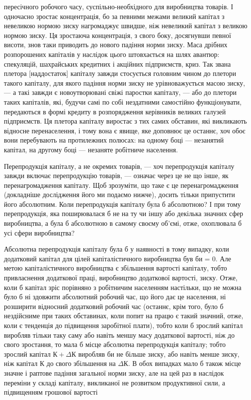 \parcont{}  %
пересічного робочого часу, суспільно-необхідного для виробництва
товарів. І одночасно зростає концентрація, бо за певними
межами великий капітал з невеликою нормою зиску нагромаджує
швидше, ніж невеликий капітал з великою нормою зиску. Ця
зростаюча концентрація, з свого боку, досягнувши певної висоти,
знов таки приводить до нового падіння норми зиску. Маса дрібних
розпорошених капіталів у наслідок цього штовхається на шлях
авантюр: спекуляцій, шахрайських кредитних і акційних підприємств,
криз. Так звана плетора [наддостаток] капіталу завжди
стосується головним чином до плетори такого капіталу, для якого
падіння норми зиску не урівноважується масою зиску, — а такі
завжди є новоутворювані свіжі паростки капіталу, — або до плетори
таких капіталів, які, будучи самі по собі нездатними самостійно
функціонувати, передаються в формі кредиту в розпорядження
керівників великих галузей підприємств. Ця плетора капіталу виростає
з тих самих обставин, які викликають відносне перенаселення,
і тому вона є явище, яке доповнює це останнє, хоч обоє
вони перебувають на протилежних полюсах: на одному боці — незанятий
капітал, на другому боці — незаняте робітниче населення.

Перепродукція капіталу, а не окремих товарів, — хоч перепродукція
капіталу завжди включає перепродукцію товарів, —
означає через це не що інше, як перенагромадження капіталу.
Щоб зрозуміти, що таке є це перенагромадження (докладніше
дослідження його ми подаємо нижче), досить тільки припустити
його абсолютним. Коли перепродукція капіталу була б абсолютною?
І при тому перепродукція, яка поширювалася б не на ту
чи іншу або декілька значних сфер виробництва, а була б абсолютною
в самому своєму об’ємі, отже, охоплювала б усі сфери
виробництва?

Абсолютна перепродукція капіталу була б у наявності в тому
випадку, коли додатковий капітал для цілей капіталістичного
виробництва був би = 0. Але метою капіталістичного виробництва
є збільшення вартості капіталу, тобто привласнення додаткової
праці, виробництво додаткової вартості, зиску. Отже,
коли б капітал зріс порівняно з робітничим населенням настільки,
що не можна було б ні здовжити абсолютний робочий час, що
його дає це населення, ні розширити відносний додатковий робочий
час (останнє, крім того, було б нездійсниме при таких обставинах,
коли попит на працю є такий значний, отже, коли є тенденція
до підвищення заробітної плати), тобто коли б зрослий
капітал виробляв тільки таку саму або навіть меншу масу додаткової
вартості, ніж до свого зростання, то мала б місце абсолютна
перепродукція капіталу; тобто зрослий капітал $К + ΔК$ виробляв
би не більше зиску, або навіть менше зиску, ніж капітал $К$
до свого збільшення на $ΔК$. В обох випадках мало б також
місце значне і раптове падіння загальної норми зиску, але на
цей раз в наслідок переміни у складі капіталу, викликаної не розвитком
продуктивної сили, а підвищенням грошової вартості
\parbreak{}  %
